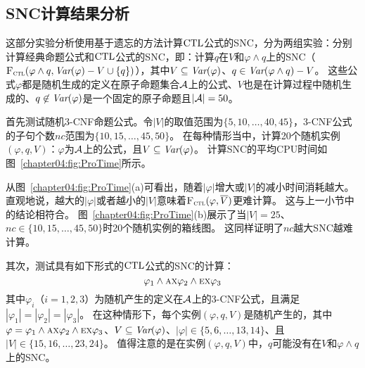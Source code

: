 \begin{figure*}[!htb]
	\centering
	\caption{$\varphi_i=16$时的计算结果}
	\label{chapter04:fig:for16}
\end{figure*}

\subsection{SNC计算结果分析}
这部分实验分析使用基于遗忘的方法计算$\textrm{CTL}$公式的SNC，分为两组实验：分别计算经典命题公式和$\textrm{CTL}$公式的SNC，即：计算$q$在$V$和$\varphi \wedge q$上的SNC（${\textsc{F}_{\textsc{ctl}}}(\varphi\wedge q, \textit{Var}(\varphi)-V \cup \{q\})$），其中$V\subseteq \textit{Var}(\varphi)$、$q\in \textit{Var}(\varphi\wedge q)-V$。
这些公式$\varphi$都是随机生成的定义在原子命题集合${\cal A}$上的公式、$V$也是在计算过程中随机生成的、$q\not \in \textit{Var}(\varphi)$是一个固定的原子命题且$|{\cal A}|=50$。

首先测试随机3-CNF命题公式。令$|V|$的取值范围为$\{5,10,\dots, 40,45\}$，3-CNF公式的子句个数$nc$范围为$\{10,15,\dots, 45,50\}$。
在每种情形当中，计算20个随机实例$(\varphi,q,V)$：$\varphi$为${\cal A}$上的公式，且$V\subseteq \textit{Var}(\varphi)$。
计算SNC的平均CPU时间如图~\ref{chapter04:fig:ProTime}所示。

\begin{figure*}[!htb]
	\centering
	\caption{%
		计算3-CNF公式的SNC所需的CPU时间情况}
	\label{chapter04:fig:ProTime}
\end{figure*}


从图~\ref{chapter04:fig:ProTime}(a)可看出，随着$|\varphi|$增大或$|V|$的减小时间消耗越大。
直观地说，越大的$|\varphi|$或者越小的$|V|$意味着${\textsc{F}_{\textsc{ctl}}}(\varphi, \overline{V})$更难计算。
这与上一小节中的结论相符合。
图~\ref{chapter04:fig:ProTime}(b)展示了当$|V|= 25$、$nc\in \{10,15,\dots, 45, 50\}$时20个随机实例的箱线图。
这同样证明了$nc$越大SNC越难计算。


其次，测试具有如下形式的$\textrm{CTL}$公式的SNC的计算：
$$\varphi_1 \wedge \textsc{a} \textsc{x} \varphi_2 \wedge \textsc{e}\textsc{x} \varphi_3$$
其中$\varphi_i$（$i=1,2,3$）为随机产生的定义在${\cal A}$上的3-CNF公式，且满足$|\varphi_1|=|\varphi_2|=|\varphi_3|$。
在这种情形下，每个实例$(\varphi, q, V)$是随机产生的，其中$\varphi=\varphi_1 \wedge \textsc{a} \textsc{x} \varphi_2 \wedge \textsc{e}\textsc{x} \varphi_3$、$V\subseteq \textit{Var}(\varphi)$、$|\varphi|\in \{5,6,\dots, 13,14\}$、且$|V|\in \{15,16,\dots, 23,24\}$。
值得注意的是在实例$(\varphi, q, V)$中，$q$可能没有在$V$和$\varphi\wedge q$上的SNC。

